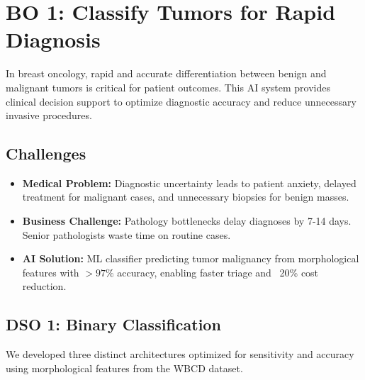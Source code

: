 \section{BO 1: Classify Tumors for Rapid Diagnosis}

\begin{infobox}[title=Context]
In breast oncology, rapid and accurate differentiation between benign and malignant tumors is critical for patient outcomes. This AI system provides clinical decision support to optimize diagnostic accuracy and reduce unnecessary invasive procedures.
\end{infobox}

\subsection{Challenges}
\begin{itemize}
    \item \textbf{Medical Problem:} Diagnostic uncertainty leads to patient anxiety, delayed treatment for malignant cases, and unnecessary biopsies for benign masses.
    \item \textbf{Business Challenge:} Pathology bottlenecks delay diagnoses by 7-14 days. Senior pathologists waste time on routine cases.
    \item \textbf{AI Solution:} ML classifier predicting tumor malignancy from morphological features with $>97\%$ accuracy, enabling faster triage and ~20\% cost reduction.
\end{itemize}

\subsection{DSO 1: Binary Classification}
We developed three distinct architectures optimized for sensitivity and accuracy using morphological features from the WBCD dataset.

